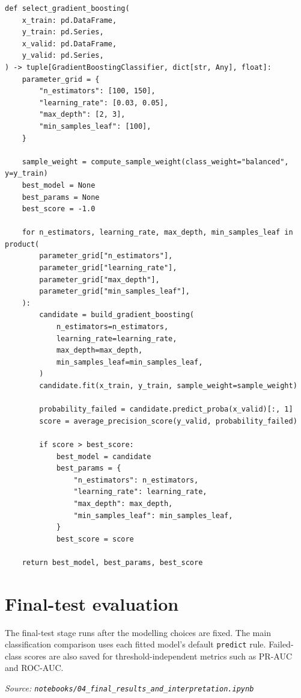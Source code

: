 \documentclass[10pt]{article}
\begin{document}
\begin{lstlisting}
def select_gradient_boosting(
    x_train: pd.DataFrame,
    y_train: pd.Series,
    x_valid: pd.DataFrame,
    y_valid: pd.Series,
) -> tuple[GradientBoostingClassifier, dict[str, Any], float]:
    parameter_grid = {
        "n_estimators": [100, 150],
        "learning_rate": [0.03, 0.05],
        "max_depth": [2, 3],
        "min_samples_leaf": [100],
    }

    sample_weight = compute_sample_weight(class_weight="balanced", y=y_train)
    best_model = None
    best_params = None
    best_score = -1.0

    for n_estimators, learning_rate, max_depth, min_samples_leaf in product(
        parameter_grid["n_estimators"],
        parameter_grid["learning_rate"],
        parameter_grid["max_depth"],
        parameter_grid["min_samples_leaf"],
    ):
        candidate = build_gradient_boosting(
            n_estimators=n_estimators,
            learning_rate=learning_rate,
            max_depth=max_depth,
            min_samples_leaf=min_samples_leaf,
        )
        candidate.fit(x_train, y_train, sample_weight=sample_weight)

        probability_failed = candidate.predict_proba(x_valid)[:, 1]
        score = average_precision_score(y_valid, probability_failed)

        if score > best_score:
            best_model = candidate
            best_params = {
                "n_estimators": n_estimators,
                "learning_rate": learning_rate,
                "max_depth": max_depth,
                "min_samples_leaf": min_samples_leaf,
            }
            best_score = score

    return best_model, best_params, best_score
\end{lstlisting}

\section{Final-test evaluation}

The final-test stage runs after the modelling choices are fixed. The main
classification comparison uses each fitted model's default \texttt{predict}
rule. Failed-class scores are also saved for threshold-independent metrics such
as PR-AUC and ROC-AUC.

\textit{Source: \texttt{notebooks/04\_final\_results\_and\_interpretation.ipynb}}
\end{document}
